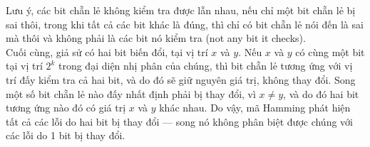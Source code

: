 \documentclass[12pt,a4paper]{article}
\begin{document}
Lưu ý, các bit chẵn lẻ không kiểm tra được lẫn nhau, nếu chỉ một bit chẵn lẻ bị sai thôi, trong khi tất cả các bit khác là đúng, thì chỉ có bit chẵn lẻ nói đến là sai mà thôi và không phải là các bit nó kiểm tra (not any bit it checks).\\

Cuối cùng, giả sử có hai bit biến đổi, tại vị trí $x$ và $y$. Nếu $x$ và $y$ có cùng một bit tại vị trí $2^k$ trong đại diện nhị phân của chúng, thì bit chẵn lẻ tương ứng với vị trí đấy kiểm tra cả hai bit, và do đó sẽ giữ nguyên giá trị, không thay đổi. Song một số bit chẵn lẻ nào đấy nhất định phải bị thay đổi, vì $x \ne y$, và do đó hai bit tương ứng nào đó có giá trị $x$ và $y$ khác nhau. Do vậy, mã Hamming phát hiện tất cả các lỗi do hai bit bị thay đổi — song nó không phân biệt được chúng với các lỗi do 1 bit bị thay đổi.
\end{document}
